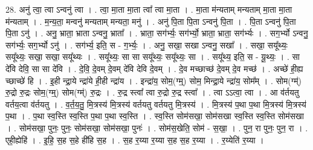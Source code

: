 \documentclass[17pt]{extarticle}
\begin{document}
28. अनु॑ त्वा॒ त्वा ऽन्वनु॑ त्वा । . त्वा॒ मा॒ता मा॒ता त्वा᳚ त्वा मा॒ता । . मा॒ता म॑न्यताम् मन्यताम् मा॒ता मा॒ता म॑न्यताम् । . म॒न्य॒ता॒ मन्वनु॑ मन्यताम् मन्यता॒ मनु॑ । . अनु॑ पि॒ता पि॒ता ऽन्वनु॑ पि॒ता । . पि॒ता ऽन्वनु॑ पि॒ता पि॒ता ऽनु॑ । . अनु॒ भ्राता॒ भ्राता ऽन्वनु॒ भ्राता᳚ । . भ्राता॒ सग॑र्भ्यः॒ सग॑र्भ्यो॒ भ्राता॒ भ्राता॒ सग॑र्भ्यः । . सग॒र्भ्यो ऽन्वनु॒ सग॑र्भ्यः॒ सग॒र्भ्यो ऽनु॑ । . सग॑र्भ्य॒ इति॒ स - ग॒र्भ्यः॒ । . अनु॒ सखा॒ सखा ऽन्वनु॒ सखा᳚ । . सखा॒ सयू᳚थ्यः॒ सयू᳚थ्यः॒ सखा॒ सखा॒ सयू᳚थ्यः । . सयू᳚थ्यः॒ सा सा सयू᳚थ्यः॒ सयू᳚थ्यः॒ सा । . सयू᳚थ्य॒ इति॒ स - यू॒थ्यः॒ । . सा दे॑वि देवि॒ सा सा दे॑वि । . दे॒वि॒ दे॒वम् दे॒वम् दे॑वि देवि दे॒वम् । . दे॒व मच्छाच्छ॑ दे॒वम् दे॒व मच्छ॑ । . अच्छे॑ ही॒ह्य च्छाच्छे॑ हि । . इ॒ही न्द्रा॒ये न्द्रा॑ये ही॒ही न्द्रा॑य । . इन्द्रा॑य॒ सोम॒(ग्म्॒) सोम॒ मिन्द्रा॒ये न्द्रा॑य॒ सोम᳚म् । . सोम(ग्म्॑) रु॒द्रो रु॒द्रः सोम॒(ग्म्॒) सोम(ग्म्॑) रु॒द्रः । . रु॒द्र स्त्वा᳚ त्वा रु॒द्रो रु॒द्र स्त्वा᳚ । . त्वा ऽऽत्वा॒ त्वा । . आ व॑र्तयतु वर्तय॒त्वा व॑र्तयतु । . व॒र्त॒य॒तु॒ मि॒त्रस्य॑ मि॒त्रस्य॑ वर्तयतु वर्तयतु मि॒त्रस्य॑ । . मि॒त्रस्य॑ प॒था प॒था मि॒त्रस्य॑ मि॒त्रस्य॑ प॒था । . प॒था स्व॒स्ति स्व॒स्ति प॒था प॒था स्व॒स्ति । . स्व॒स्ति सोम॑सखा॒ सोम॑सखा स्व॒स्ति स्व॒स्ति सोम॑सखा । . सोम॑सखा॒ पुनः॒ पुनः॒ सोम॑सखा॒ सोम॑सखा॒ पुनः॑ । . सोम॑स॒खेति॒ सोम॑ - स॒खा॒ । . पुन॒ रा पुनः॒ पुन॒ रा । . एही॒ह्येहि॑ । . इ॒हि॒ स॒ह स॒हे ही॑हि स॒ह । . स॒ह र॒य्या र॒य्या स॒ह स॒ह र॒य्या । . र॒य्येति॑ र॒य्या । \newline
\end{document}
